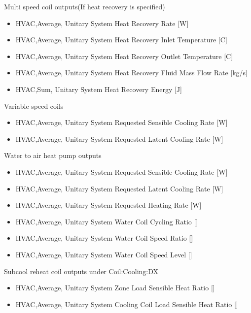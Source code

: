 Multi speed coil outputs(If heat recovery is specified)

\begin{itemize}
\item
  HVAC,Average, Unitary System Heat Recovery Rate {[}W{]}
\item
  HVAC,Average, Unitary System Heat Recovery Inlet Temperature {[}C{]}
\item
  HVAC,Average, Unitary System Heat Recovery Outlet Temperature {[}C{]}
\item
  HVAC,Average, Unitary System Heat Recovery Fluid Mass Flow Rate {[}kg/s{]}
\item
  HVAC,Sum, Unitary System Heat Recovery Energy {[}J{]}
\end{itemize}

Variable speed coils

\begin{itemize}
\item
  HVAC,Average, Unitary System Requested Sensible Cooling Rate {[}W{]}
\item
  HVAC,Average, Unitary System Requested Latent Cooling Rate {[}W{]}
\end{itemize}


Water to air heat pump outputs

\begin{itemize}
\item
  HVAC,Average, Unitary System Requested Sensible Cooling Rate {[}W{]}
\item
  HVAC,Average, Unitary System Requested Latent Cooling Rate {[}W{]}
\item
  HVAC,Average, Unitary System Requested Heating Rate {[}W{]}
\item
  HVAC,Average, Unitary System Water Coil Cycling Ratio {[]}
\item
  HVAC,Average, Unitary System Water Coil Speed Ratio {[]}
\item
  HVAC,Average, Unitary System Water Coil Speed Level {[]}
\end{itemize}

Subcool reheat coil outputs under Coil:Cooling:DX

\begin{itemize}
\item
  HVAC,Average, Unitary System Zone Load Sensible Heat Ratio {[]}
\item
  HVAC,Average, Unitary System Cooling Coil Load Sensible Heat Ratio {[]}
\end{itemize}

